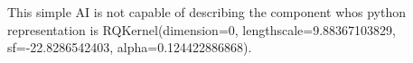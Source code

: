 This simple AI is not capable of describing the component whos python representation is RQKernel(dimension=0, lengthscale=9.88367103829, sf=-22.8286542403, alpha=0.124422886868).
